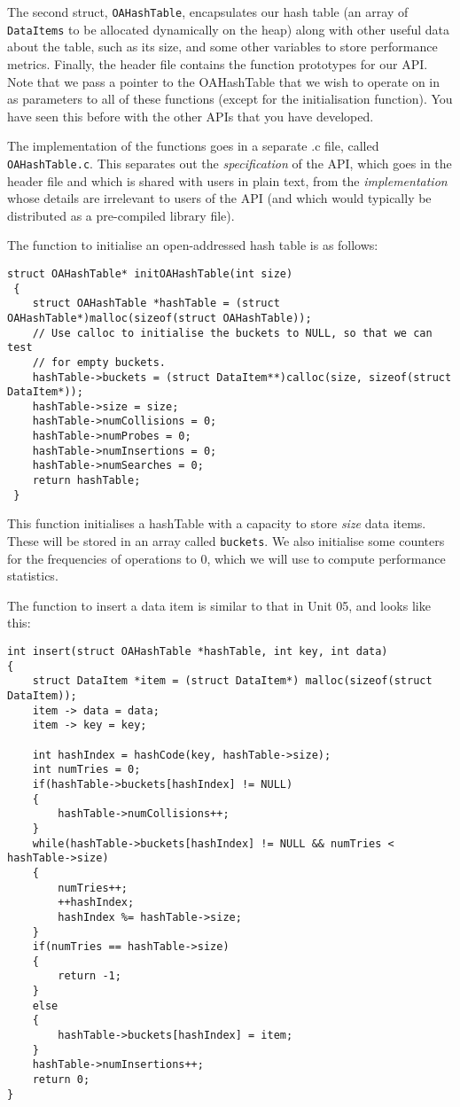 \documentclass[10pt, a4paper, twosize]{article}
\begin{document}
The second struct, \texttt{OAHashTable}, encapsulates our hash table (an array of \texttt{DataItems} to be allocated dynamically on the heap) along with other useful data about the table, such as its size, and some other variables to store performance metrics. Finally, the header file contains the function prototypes for our API. Note that we pass a pointer to the OAHashTable that we wish to operate on in as parameters to all of these functions (except for the initialisation function). You have seen this before with the other APIs that you have developed. 

The implementation of the functions goes in a separate .c file, called \texttt{OAHashTable.c}. This separates out the \emph{specification} of the API, which goes in the header file and which is shared with users in plain text, from the \emph{implementation} whose details are irrelevant to users of the API (and which would typically be distributed as a pre-compiled library file).

The function to initialise an open-addressed hash table is as follows:
\begin{lstlisting}
struct OAHashTable* initOAHashTable(int size)
 {
 	struct OAHashTable *hashTable = (struct OAHashTable*)malloc(sizeof(struct OAHashTable));
	// Use calloc to initialise the buckets to NULL, so that we can test
	// for empty buckets.
	hashTable->buckets = (struct DataItem**)calloc(size, sizeof(struct DataItem*));
 	hashTable->size = size;
	hashTable->numCollisions = 0;
	hashTable->numProbes = 0;
	hashTable->numInsertions = 0;
	hashTable->numSearches = 0;
	return hashTable;
 }
\end{lstlisting}
This function initialises a hashTable with a capacity to store \textit{size} data items. These will be stored in an array called \texttt{buckets}. We also initialise some counters for the frequencies of operations to 0, which we will use to compute performance statistics.

The function to insert a data item is similar to that in Unit 05, and looks like this:
\begin{lstlisting}
int insert(struct OAHashTable *hashTable, int key, int data)
{
    struct DataItem *item = (struct DataItem*) malloc(sizeof(struct DataItem));
    item -> data = data;
    item -> key = key;

    int hashIndex = hashCode(key, hashTable->size);
    int numTries = 0;
    if(hashTable->buckets[hashIndex] != NULL)
    {
        hashTable->numCollisions++;
    }
    while(hashTable->buckets[hashIndex] != NULL && numTries < hashTable->size)
    {
        numTries++;
        ++hashIndex;
        hashIndex %= hashTable->size;
    }
    if(numTries == hashTable->size)
    {
        return -1;
    }
    else
    {
        hashTable->buckets[hashIndex] = item;
    }
    hashTable->numInsertions++;
    return 0;
}
\end{lstlisting}
\end{document}
